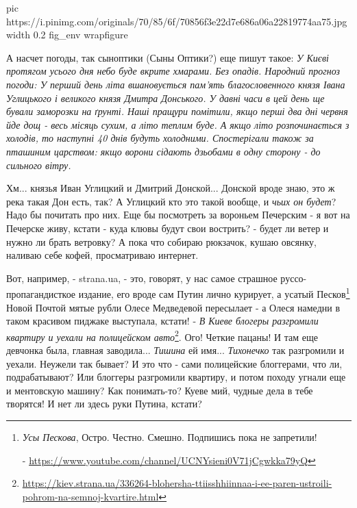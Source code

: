 \ifcmt
  pic https://i.pinimg.com/originals/70/85/6f/70856f3e22d7e686a06a22819774aa75.jpg
  width 0.2
  fig_env wrapfigure
\fi

А насчет погоды, так сыноптики (Сыны Оптики?) еще пишут такое: \emph{У Києві
протягом усього дня небо буде вкрите хмарами.  Без опадів. Народний прогноз
погоди: У перший день літа вшановується пам'ять благословенного князя Івана
Углицького і великого князя Дмитра Донського. У давні часи в цей день ще бували
заморозки на ґрунті.  Наші пращури помітили, якщо перші два дні червня йде дощ
- весь місяць сухим, а літо теплим буде. А якщо літо розпочинається з холодів,
то наступні 40 днів будуть холодними.  Спостерігали також за пташиним царством:
якщо ворони сідають дзьобами в одну сторону - до сильного вітру.}

Хм... князья Иван Углицкий и Дмитрий Донской... Донской вроде знаю, это ж река
такая Дон есть, так? А Углицкий кто это такой вообще, и \emph{чьих он будет}?
Надо бы почитать про них. Еще бы посмотреть за вороньем Печерским - я вот на
Печерске живу, кстати - куда клювы будут свои вострить? - будет ли ветер и
нужно ли брать ветровку?  А пока что собираю рюкзачок, кушаю овсянку, наливаю
себе кофей, просматриваю интернет. 


Вот, например, - strana.ua, - это, говорят, у нас самое страшное
руссо-пропагандисткое издание, его вроде сам Путин лично курирует, а усатый
Песков\footnote{\emph{Усы Пескова}, Остро. Честно. Смешно. Подпишись пока не
запретили!\par -
\url{https://www.youtube.com/channel/UCNYsieni0V71jCgwkka79yQ}} Новой Почтой
мятые рубли Олесе Медведевой пересылает - а Олеся намедни в таком красивом
пиджаке выступала, кстати! - \emph{В Киеве блогеры разгромили квартиру и уехали
на полицейском
авто}\footnote{\url{https://kiev.strana.ua/336264-blohersha-ttiisshhiinnaa-i-ee-paren-ustroili-pohrom-na-semnoj-kvartire.html}}.
Ого! Четкие пацаны! И там еще девчонка была, главная заводила... \emph{Тишина}
ей имя... \emph{Тихонечко} так разгромили и уехали. Неужели так бывает? И это
что - сами полицейские блоггерами, что ли, подрабатывают? Или блоггеры
разгромили квартиру, и потом походу угнали еще и ментовскую машину? Как
понимать-то? Куеве мий, чудные дела в тебе творятся! И нет ли здесь руки
Путина, кстати? 

